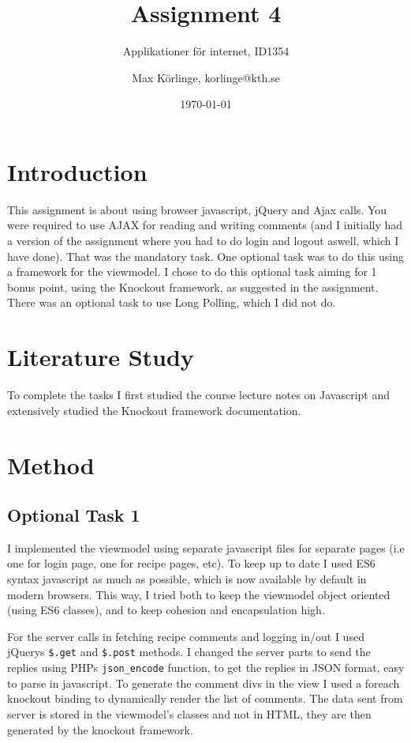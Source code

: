 \documentclass[a4paper]{scrreprt}
\title{Assignment 4}
\subtitle{Applikationer för internet, ID1354}
\author{Max Körlinge, korlinge@kth.se}
\date{\today}
\newcommand{\code}[1]{\texttt{#1}}
\begin{document}
\maketitle

\tableofcontents %
\clearpage

\chapter{Introduction}

This assignment is about using browser javascript, jQuery and Ajax calls. You were required to use AJAX for reading and writing comments (and I initially had a version of the assignment where you had to do login and logout aswell, which I have done). That was the mandatory task. One optional task was to do this using a framework for the viewmodel. I chose to do this optional task aiming for 1 bonus point, using the Knockout framework, as suggested in the assignment. There was an optional task to use Long Polling, which I did not do.

\chapter{Literature Study}

To complete the tasks I first studied the course lecture notes on Javascript and extensively studied the Knockout framework documentation.

\chapter{Method}

\section{Optional Task 1}

I implemented the viewmodel using separate javascript files for separate pages (i.e one for login page, one for recipe pages, etc). To keep up to date I used ES6 syntax javascript as much as possible, which is now available by default in modern browsers. This way, I tried both to keep the viewmodel object oriented (using ES6 classes), and to keep cohesion and encapsulation high.

For the server calls in fetching recipe comments and logging in/out I used jQuerys \code{\$.get} and \code{\$.post} methods. I changed the server parts to send the replies using PHPs \code{json\_encode} function, to get the replies in JSON format, easy to parse in javascript. To generate the comment divs in the view I used a foreach knockout binding to dynamically render the list of comments. The data sent from server is stored in the viewmodel's classes and not in HTML, they are then generated by the knockout framework.
\end{document}
